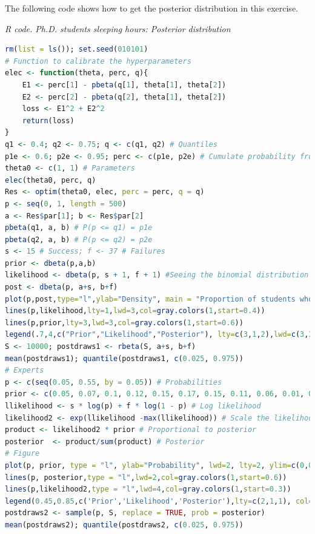 \begin{enumerate}[leftmargin=*]
The following code shows how to get the posterior distribution in this exercise.
\begin{tcolorbox}[enhanced,width=4.67in,center upper,
	fontupper=\large\bfseries,drop shadow southwest,sharp corners]
	\textit{R code. Ph.D. students sleeping hours: Posterior distribution}
	\begin{VF}
		\begin{lstlisting}[language=R]
rm(list = ls()); set.seed(010101)
# Function to calibrate the hyperparameters
elec <- function(theta, perc, q){
	E1 <- perc[1] - pbeta(q[1], theta[1], theta[2])
	E2 <- perc[2] - pbeta(q[2], theta[1], theta[2])
	loss <- E1^2 + E2^2
	return(loss)
}
q1 <- 0.4; q2 <- 0.75; q <- c(q1, q2) # Quantiles
p1e <- 0.6; p2e <- 0.95; perc <- c(p1e, p2e) # Cumulate probability from experts 
theta0 <- c(1, 1) # Parameters
elec(theta0, perc, q)
Res <- optim(theta0, elec, perc = perc, q = q)
p <- seq(0, 1, length = 500)
a <- Res$par[1]; b <- Res$par[2]
pbeta(q1, a, b) # P(p <= q1) = p1e
pbeta(q2, a, b) # P(p <= q2) = p2e
s <- 15 # Success; f <- 37 # Failures
prior <- dbeta(p,a,b)
likelihood <- dbeta(p, s + 1, f + 1) #Seeing the binomial distribution as a likelihood is a beta distribution!!!
post <- dbeta(p, a+s, b+f)
plot(p,post,type="l",ylab="Density", main = "Proportion of students who sleep at least 6 hours per day",lty=2,lwd=3,col=gray.colors(1,start=0.1))
lines(p,likelihood,lty=1,lwd=3,col=gray.colors(1,start=0.4))
lines(p,prior,lty=3,lwd=3,col=gray.colors(1,start=0.6))
legend(.7,4,c("Prior","Likelihood","Posterior"), lty=c(3,1,2),lwd=c(3,3,3),col=c(col=gray.colors(1,start=0.6),col=gray.colors(1,start=0.4),col=gray.colors(1,start=0.1)))
S <- 10000; postdraws1 <- rbeta(S, a+s, b+f)
mean(postdraws1); quantile(postdraws1, c(0.025, 0.975))
# Experts
p <- c(seq(0.05, 0.55, by = 0.05)) # Probabilities
prior <- c(0.05, 0.07, 0.1, 0.12, 0.15, 0.17, 0.15, 0.11, 0.06, 0.01, 0.01) # Expert assessment
llikelihood <- s * log(p) + f * log(1 - p) # Log likelihood
likelihood2 <- exp(llikelihood -max(llikelihood)) # Scale the likelihood for plotting
product <- likelihood2 * prior # Proportional to posterior
posterior  <- product/sum(product) # Posterior
# Figure
plot(p, prior, type = "l", ylab="Probability", lwd=2, lty=2, ylim=c(0,0.99), xlim = c(0, 0.6), col=gray.colors(1,start=0.1), main = "Posterior distribution: Proportion sleep hours")
lines(p, posterior,type = "l",lwd=2,col=gray.colors(1,start=0.6))
lines(p,likelihood2,type = "l",lwd=4,col=gray.colors(1,start=0.3))
legend(0.45,0.85,c('Prior','Likelihood','Posterior'),lty=c(2,1,1), col=c(gray.colors(1,start=0.1),gray.colors(1,start=0.3),gray.colors(1,start=0.6)),lwd=2)
postdraws2 <- sample(p, S, replace = TRUE, prob = posterior)
mean(postdraws2); quantile(postdraws2, c(0.025, 0.975))
\end{lstlisting}
	\end{VF}
\end{tcolorbox} 


\end{enumerate}
